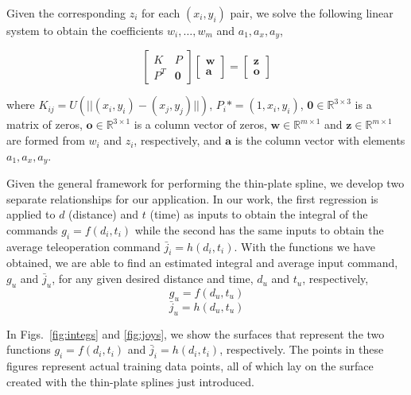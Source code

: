 \documentclass[letterpaper, 10 pt, conference]{ieeeconf}  %
\begin{document}
Given the corresponding $z_i$ for each $(x_i,y_i)$ pair, we solve the following linear system to obtain the coefficients $w_i,\ldots,w_m$ and $a_1,a_x,a_y$,

\begin{equation}
    \begin{bmatrix}
    K&P\\
    P^T& \bm{0}
    \end{bmatrix}
    \begin{bmatrix}
    \bm{w}\\
    \bm{a}
    \end{bmatrix} = 
    \begin{bmatrix}
    \bm{z}\\
    \bm{o}
    \end{bmatrix}
\end{equation}

where $K_{ij} = U(||(x_i,y_i)-(x_j,y_j)||)$, $P_i* = (1,x_i,y_i)$, $\bm{0}  \in \mathbb{R}^{3\times3}$ is a matrix of zeros, $\bm{o} \in \mathbb{R}^{3\times1}$ is a column vector of zeros, $\bm{w} \in \mathbb{R}^{m\times1}$ and $\bm{z} \in \mathbb{R}^{m\times1}$ are formed from $w_i$ and $z_i$, respectively, and $\bm{a}$ is the column vector with elements $a_1,a_x,a_y$.

Given the general framework for performing the thin-plate spline, we develop two separate relationships for our application. In our work, the first regression is applied to $d$ (distance) and $t$ (time) as inputs to obtain the integral of the commands $g_i = f(d_i,t_i)$ while the second has the same inputs to obtain the average teleoperation command $\bar{j}_i = h(d_i,t_i)$. With the functions we have obtained, we are able to find an estimated integral and average input command, $g_u$ and $\bar{j}_u$, for any given desired distance and time, $d_u$ and $t_u$, respectively,
\begin{equation} \label{eq:integralfit}
g_u = f(d_u,t_u)
\end{equation}
\begin{equation} \label{eq:ssvelfit}
\bar{j}_u = h(d_u,t_u)
\end{equation}

In Figs.~\ref{fig:integs} and \ref{fig:joys}, we show the surfaces that represent the two functions $g_i = f(d_i,t_i)$ and $\bar{j}_i = h(d_i,t_i)$, respectively. The points in these figures represent actual training data points, all of which lay on the surface created with the thin-plate splines just introduced.
\end{document}
